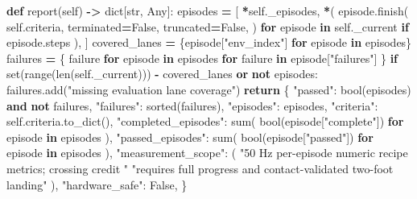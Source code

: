 \documentclass[
  chinese,
  11pt,
  letterpaper,
]{article}
\newenvironment{Shaded}{\begin{snugshade}}{\end{snugshade}}
\newcommand{\BuiltInTok}[1]{#1}
\newcommand{\ControlFlowTok}[1]{\textcolor[rgb]{0.13,0.29,0.53}{\textbf{#1}}}
\newcommand{\KeywordTok}[1]{\textcolor[rgb]{0.13,0.29,0.53}{\textbf{#1}}}
\newcommand{\NormalTok}[1]{#1}
\newcommand{\OperatorTok}[1]{\textcolor[rgb]{0.81,0.36,0.00}{\textbf{#1}}}
\newcommand{\StringTok}[1]{\textcolor[rgb]{0.31,0.60,0.02}{#1}}
\newcommand{\VariableTok}[1]{\textcolor[rgb]{0.00,0.00,0.00}{#1}}
\renewenvironment{Shaded}{\par\smallskip}{\par\smallskip}
\begin{document}
\begin{Shaded}
\begin{Highlighting}[]
    \KeywordTok{def}\NormalTok{ report(}\VariableTok{self}\NormalTok{) }\OperatorTok{{-}\textgreater{}} \BuiltInTok{dict}\NormalTok{[}\BuiltInTok{str}\NormalTok{, Any]:}
\NormalTok{        episodes }\OperatorTok{=}\NormalTok{ [}
            \OperatorTok{*}\VariableTok{self}\NormalTok{.\_episodes,}
            \OperatorTok{*}\NormalTok{(}
\NormalTok{                episode.finish(}
                    \VariableTok{self}\NormalTok{.criteria,}
\NormalTok{                    terminated}\OperatorTok{=}\VariableTok{False}\NormalTok{,}
\NormalTok{                    truncated}\OperatorTok{=}\VariableTok{False}\NormalTok{,}
\NormalTok{                )}
                \ControlFlowTok{for}\NormalTok{ episode }\KeywordTok{in} \VariableTok{self}\NormalTok{.\_current}
                \ControlFlowTok{if}\NormalTok{ episode.steps}
\NormalTok{            ),}
\NormalTok{        ]}
\NormalTok{        covered\_lanes }\OperatorTok{=}\NormalTok{ \{episode[}\StringTok{"env\_index"}\NormalTok{] }\ControlFlowTok{for}\NormalTok{ episode }\KeywordTok{in}\NormalTok{ episodes\}}
\NormalTok{        failures }\OperatorTok{=}\NormalTok{ \{}
\NormalTok{            failure}
            \ControlFlowTok{for}\NormalTok{ episode }\KeywordTok{in}\NormalTok{ episodes}
            \ControlFlowTok{for}\NormalTok{ failure }\KeywordTok{in}\NormalTok{ episode[}\StringTok{"failures"}\NormalTok{]}
\NormalTok{        \}}
        \ControlFlowTok{if} \BuiltInTok{set}\NormalTok{(}\BuiltInTok{range}\NormalTok{(}\BuiltInTok{len}\NormalTok{(}\VariableTok{self}\NormalTok{.\_current))) }\OperatorTok{{-}}\NormalTok{ covered\_lanes }\KeywordTok{or} \KeywordTok{not}\NormalTok{ episodes:}
\NormalTok{            failures.add(}\StringTok{"missing evaluation lane coverage"}\NormalTok{)}
        \ControlFlowTok{return}\NormalTok{ \{}
            \StringTok{"passed"}\NormalTok{: }\BuiltInTok{bool}\NormalTok{(episodes) }\KeywordTok{and} \KeywordTok{not}\NormalTok{ failures,}
            \StringTok{"failures"}\NormalTok{: }\BuiltInTok{sorted}\NormalTok{(failures),}
            \StringTok{"episodes"}\NormalTok{: episodes,}
            \StringTok{"criteria"}\NormalTok{: }\VariableTok{self}\NormalTok{.criteria.to\_dict(),}
            \StringTok{"completed\_episodes"}\NormalTok{: }\BuiltInTok{sum}\NormalTok{(}
                \BuiltInTok{bool}\NormalTok{(episode[}\StringTok{"complete"}\NormalTok{]) }\ControlFlowTok{for}\NormalTok{ episode }\KeywordTok{in}\NormalTok{ episodes}
\NormalTok{            ),}
            \StringTok{"passed\_episodes"}\NormalTok{: }\BuiltInTok{sum}\NormalTok{(}
                \BuiltInTok{bool}\NormalTok{(episode[}\StringTok{"passed"}\NormalTok{]) }\ControlFlowTok{for}\NormalTok{ episode }\KeywordTok{in}\NormalTok{ episodes}
\NormalTok{            ),}
            \StringTok{"measurement\_scope"}\NormalTok{: (}
                \StringTok{"50 Hz per{-}episode numeric recipe metrics; crossing credit "}
                \StringTok{"requires full progress and contact{-}validated two{-}foot landing"}
\NormalTok{            ),}
            \StringTok{"hardware\_safe"}\NormalTok{: }\VariableTok{False}\NormalTok{,}
\NormalTok{        \}}



\end{Highlighting}
\end{Shaded}
\end{document}
